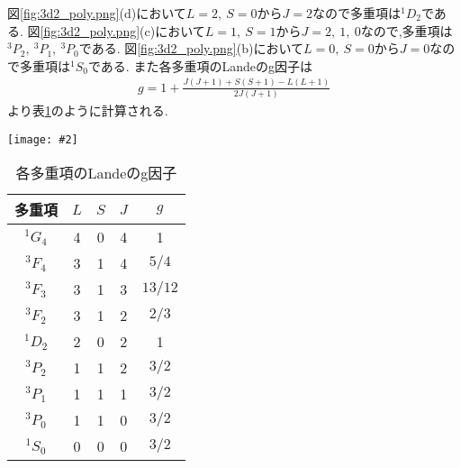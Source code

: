 \documentclass[uplatex,a4j,11pt,dvipdfmx]{jsarticle}
\makeatletter
\def\fgcaption{\def\@captype{figure}\caption}
\newcommand{\mfig}[3][width=15cm]{
\begin{center}
\texttt{[image: \#2]}
\fgcaption{#3 \label{fig:#2}}
\end{center}
}
\makeatother
\begin{document}
図\ref{fig:3d2_poly.png}(d)において$L=2,\ S=0$から$J=2$なので多重項は$^1D_2$である.
図\ref{fig:3d2_poly.png}(c)において$L=1,\ S=1$から$J=2,\ 1,\ 0$なので,多重項は$^3P_2,\ ^3P_1,\ ^3P_0$である.
図\ref{fig:3d2_poly.png}(b)において$L=0,\ S=0$から$J=0$なので多重項は$^1S_0$である.
また各多重項のLandeのg因子は
\begin{align}
  g=1+\frac{J(J+1)+S(S+1)-L(L+1)}{2J(J+1)}
\end{align}
より表\ref{tab:lande}のように計算される.
\mfig[width=14cm]{3d2_poly.png}{$M_L$-$M_S$平面における状態の分解,及びその多重項}
\begin{table}[h]
  \caption{各多重項のLandeのg因子}
  \label{tab:lande}
  \centering
  \begin{tabular}{c|ccc|c}
    \hline
    多重項&$L$&$S$&$J$&$g$\\
    \hline \hline
    $^1G_4$&4&0&4&1\\
    $^3F_4$&3&1&4&$5/4$\\
    $^3F_3$&3&1&3&$13/12$\\
    $^3F_2$&3&1&2&$2/3$\\
    $^1D_2$&2&0&2&1\\
    $^3P_2$&1&1&2&$3/2$\\
    $^3P_1$&1&1&1&$3/2$\\
    $^3P_0$&1&1&0&$3/2$\\
    $^1S_0$&0&0&0&$3/2$\\
    \hline
  \end{tabular}
\end{table}

\end{document}

